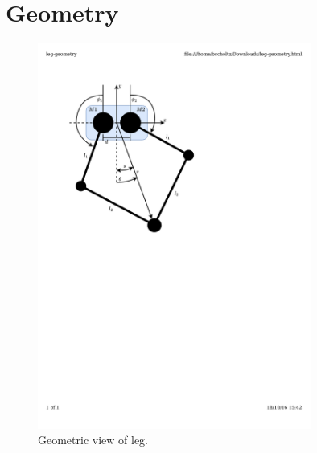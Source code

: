 \chapter{Geometry}
\label{chap:Geometry}

\begin{figure}
\centering
\includegraphics[clip, trim=2cm 15cm 7cm 2cm, page = 1, width=0.8\textwidth]{images/geometry/leg-geometry} 
\caption{Geometric view of leg.}
\label{fig:Geometric view of leg}
\end{figure}